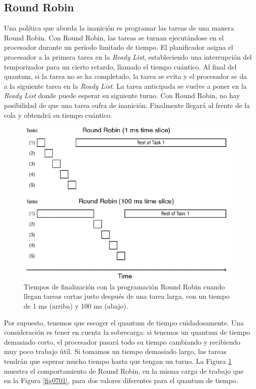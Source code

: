 \documentclass[10pt]{book}
\begin{document}
\subsection{Round Robin}
Una política que aborda la inanición es programar las tareas de una manera Round Robin. Con Round Robin, las tareas se turnan ejecutándose en el procesador durante un período limitado de tiempo. El planificador asigna el procesador a la primera tarea en la \textit{Ready List}, estableciendo una interrupción del temporizador para un cierto retardo, llamado el tiempo cuántico. Al final del quantum, si la tarea no se ha completado, la tarea se evita y el procesador se da a la siguiente tarea en la \textit{Ready List}. La tarea anticipada se vuelve a poner en la \textit{Ready List} donde puede esperar su siguiente turno. Con Round Robin, no hay posibilidad de que una tarea sufra de inanición. Finalmente llegará al frente de la cola y obtendrá su tiempo cuántico.


\begin{figure}[tbhp]
\centerline{\includegraphics[scale=0.70]{img/fig0702}}
\caption{Tiempos de finalización con la programación Round Robin cuando llegan tareas cortas justo después de una tarea larga, con un tiempo de 1 ms (arriba) y 100 ms (abajo).}
\label{fig0702}
\end{figure}

Por supuesto, tenemos que escoger el quantum de tiempo cuidadosamente. Una consideración es tener en cuenta la sobrecarga: si tenemos un quantum de tiempo demasiado corto, el procesador pasará todo su tiempo cambiando y recibiendo muy poco trabajo útil. Si tomamos un tiempo demasiado largo, las tareas tendrán que esperar mucho tiempo hasta que tengan un turno. La Figura \ref{fig0702} muestra el comportamiento de Round Robin, en la misma carga de trabajo que en la Figura \ref{fig0701}, para dos valores diferentes para el quantum de tiempo.
\end{document}
